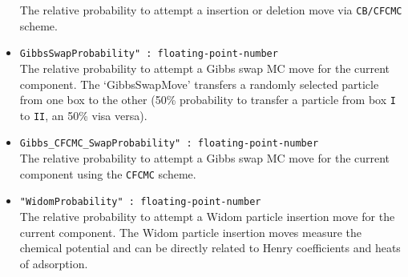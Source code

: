 \begin{itemize}
  The relative probability to attempt a insertion or deletion move via \texttt{CB/CFCMC} scheme.
\item{\verb+GibbsSwapProbability" : floating-point-number+}\\
The relative probability to attempt a Gibbs swap MC move for the current component. 
The `GibbsSwapMove' transfers a randomly selected particle from one box to the other
    (50\% probability to transfer a particle from box \texttt{I} to \texttt{II}, an 50\% visa versa).
\item{\verb+Gibbs_CFCMC_SwapProbability" : floating-point-number+}\\
The relative probability to attempt a Gibbs swap MC move for the current component
    using the \texttt{CFCMC} scheme.
\item{\verb+"WidomProbability" : floating-point-number+}\\
The relative probability to attempt a Widom particle insertion move for the current component. 
The Widom particle insertion moves measure the chemical potential
and can be directly related to Henry coefficients and heats of adsorption.
\end{itemize}
